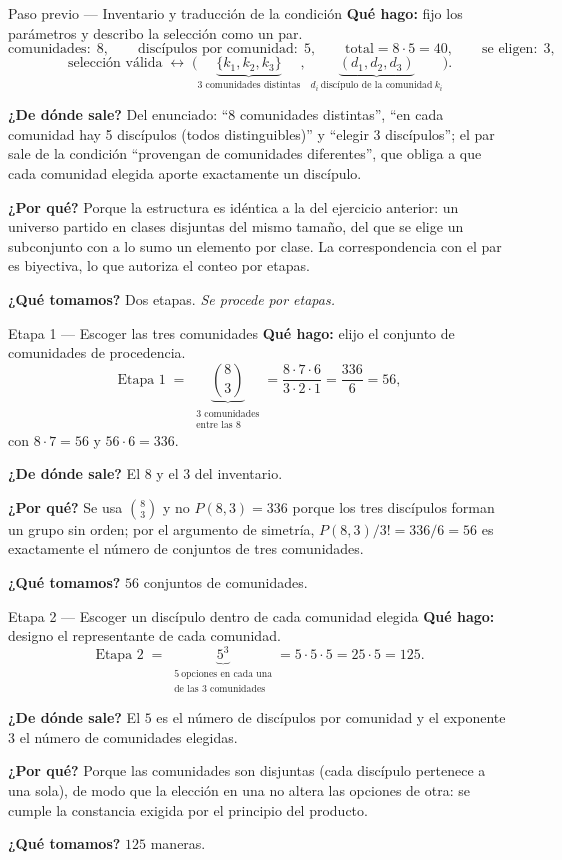\documentclass[11pt]{article}
\begin{document}
\begin{paso}{Paso previo --- Inventario y traducci\'on de la condici\'on}
\textbf{Qu\'e hago:} fijo los par\'ametros y describo la selecci\'on como un par.
\[
\text{comunidades}:\;8,\qquad \text{disc\'ipulos por comunidad}:\;5,\qquad
\text{total}=8\cdot 5=40,\qquad \text{se eligen}:\;3 ,
\]
\[
\text{selecci\'on v\'alida}\;\longleftrightarrow\;
\Big(\underbrace{\{k_1,k_2,k_3\}}_{\text{3 comunidades distintas}},\;
\underbrace{(d_1,d_2,d_3)}_{d_i\ \text{disc\'ipulo de la comunidad}\ k_i}\Big) .
\]

\textbf{¿De d\'onde sale?} Del enunciado: ``8 comunidades distintas'', ``en cada comunidad hay 5
disc\'ipulos (todos distinguibles)'' y ``elegir 3 disc\'ipulos''; el par sale de la condici\'on ``provengan
de comunidades diferentes'', que obliga a que cada comunidad elegida aporte exactamente un disc\'ipulo.

\textbf{¿Por qu\'e?} Porque la estructura es id\'entica a la del ejercicio anterior: un universo partido en
clases disjuntas del mismo tama\~no, del que se elige un subconjunto con a lo sumo un elemento por clase. La
correspondencia con el par es biyectiva, lo que autoriza el conteo por etapas.

\textbf{¿Qu\'e tomamos?} Dos etapas. \emph{Se procede por etapas.}
\end{paso}

\begin{paso}{Etapa 1 --- Escoger las tres comunidades}
\textbf{Qu\'e hago:} elijo el conjunto de comunidades de procedencia.
\[
\text{Etapa 1}\;=\;\underbrace{\binom{8}{3}}_{\substack{\text{3 comunidades}\\ \text{entre las 8}}}
=\frac{8\cdot 7\cdot 6}{3\cdot 2\cdot 1}=\frac{336}{6}=56 ,
\]
con $8\cdot 7=56$ y $56\cdot 6=336$.

\textbf{¿De d\'onde sale?} El $8$ y el $3$ del inventario.

\textbf{¿Por qu\'e?} Se usa $\binom{8}{3}$ y no $P(8,3)=336$ porque los tres disc\'ipulos forman un grupo sin
orden; por el argumento de simetr\'ia, $P(8,3)/3!=336/6=56$ es exactamente el n\'umero de conjuntos de tres
comunidades.

\textbf{¿Qu\'e tomamos?} $56$ conjuntos de comunidades.
\end{paso}

\begin{paso}{Etapa 2 --- Escoger un disc\'ipulo dentro de cada comunidad elegida}
\textbf{Qu\'e hago:} designo el representante de cada comunidad.
\[
\text{Etapa 2}\;=\;\underbrace{5^3}_{\substack{5\ \text{opciones en cada una}\\ \text{de las 3 comunidades}}}
=5\cdot 5\cdot 5=25\cdot 5=125 .
\]

\textbf{¿De d\'onde sale?} El $5$ es el n\'umero de disc\'ipulos por comunidad y el exponente $3$ el
n\'umero de comunidades elegidas.

\textbf{¿Por qu\'e?} Porque las comunidades son disjuntas (cada disc\'ipulo pertenece a una sola), de modo
que la elecci\'on en una no altera las opciones de otra: se cumple la constancia exigida por el principio
del producto.

\textbf{¿Qu\'e tomamos?} $125$ maneras.
\end{paso}
\end{document}
